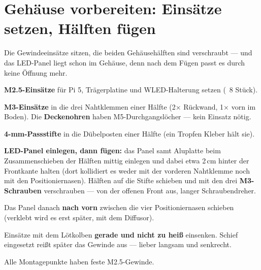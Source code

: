 \clearpage
\section{Gehäuse vorbereiten: Einsätze setzen, Hälften fügen}
\begin{ziel}
Die Gewindeeinsätze sitzen, die beiden Gehäusehälften sind verschraubt — und das LED-Panel
liegt schon im Gehäuse, denn nach dem Fügen passt es durch keine Öffnung mehr.
\end{ziel}
\begin{schritte}
  \item \textbf{M2.5-Einsätze} für Pi 5, Trägerplatine und WLED-Halterung setzen (~8 Stück).
  \item \textbf{M3-Einsätze} in die drei Nahtklemmen einer Hälfte (2× Rückwand, 1× vorn
        im Boden). Die \textbf{Deckenohren} haben M5-Durchgangslöcher — kein Einsatz nötig.
  \item \textbf{4-mm-Passstifte} in die Dübelposten einer Hälfte (ein Tropfen Kleber hält sie).
  \item \textbf{LED-Panel einlegen, dann fügen:} das Panel samt Aluplatte beim
        Zusammenschieben der Hälften mittig einlegen und dabei etwa 2\,cm hinter der
        Frontkante halten (dort kollidiert es weder mit der vorderen Nahtklemme noch mit
        den Positioniernasen). Hälften auf die Stifte schieben und mit den drei
        \textbf{M3-Schrauben} verschrauben — von der offenen Front aus, langer
        Schraubendreher.
  \item Das Panel danach \textbf{nach vorn} zwischen die vier Positioniernasen schieben
        (verklebt wird es erst später, mit dem Diffusor).
\end{schritte}
\begin{achtung}
Einsätze mit dem Lötkolben \textbf{gerade und nicht zu heiß} einsenken. Schief eingesetzt
reißt später das Gewinde aus — lieber langsam und senkrecht.
\end{achtung}
\begin{ergebnis}
Alle Montagepunkte haben feste M2.5-Gewinde.
\end{ergebnis}

\clearpage
